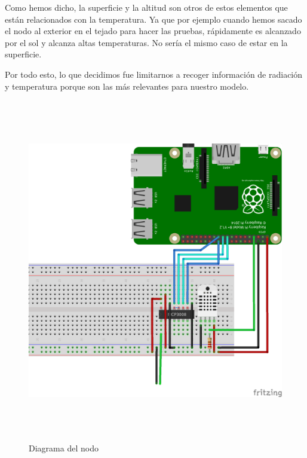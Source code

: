 Como hemos dicho, la superficie y la altitud son otros de estos elementos que están relacionados con la temperatura. Ya que por ejemplo cuando hemos sacado el nodo al exterior en el tejado para hacer las pruebas, rápidamente es alcanzado por el sol y alcanza altas temperaturas. No sería el mismo caso de estar en la superficie.

Por todo esto, lo que decidimos fue limitarnos a recoger información de radiación y temperatura porque son las más relevantes para nuestro modelo.

\begin{figure}[htb]
	
	\begin{center}
		\includegraphics[width=15cm,height=15cm]{figures/solar_project_node_diagram.png}
		\caption{Diagrama del nodo}
	\end{center}
	
	\label{node-diagram}
\end{figure}
